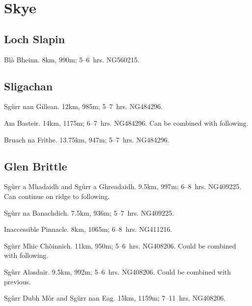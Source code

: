 
\section{Skye}

\subsection{Loch Slapin}

\begin{munros}
\item
Blà Bheinn.  8km, 990m; 5--6~hrs.  NG560215.  \tick
\end{munros}


\subsection{Sligachan}

\begin{munros}
\item
\target  Sgùrr nan Gillean.  12km, 985m; 5--7~hrs.  NG484296.  \tick

\item
\target Am Basteir.  14km, 1175m; 6--7~hrs.  NG484296.  Can be combined
with following. \tick

\item
\target Bruach na Frìthe.  13.75km, 947m; 5--7~hrs.   NG484296.  \tick
\end{munros}


\subsection{Glen Brittle}

\begin{munros}
\item
\target Sgùrr a Mhadaidh and Sgùrr a Ghreadaidh.  9.5km, 997m; 6--8~hrs.
NG409225.  Can continue on ridge to following.  \tick

\item
Sgùrr na Banachdich.  7.5km, 936m; 5--7~hrs.  NG409225.  \tick

\item
\target\target Inaccessible Pinnacle.  8km, 1065m; 6--8~hrs.  NG411216.  \tick

\item
\target\target Sgùrr Mhic Chòinnich.  11km, 950m; 5--6~hrs.  NG408206.  Could
be combined with following.  \tick

\item
Sgùrr Alasdair.  9.5km, 992m; 5--6~hrs. NG408206.  Could be
combined with previous.  \tick

\item
\target\target  Sgùrr Dubh Mòr and Sgùrr nan Eag.  15km, 1159m; 7--11~hrs.
NG408206.  \tick
\end{munros}
